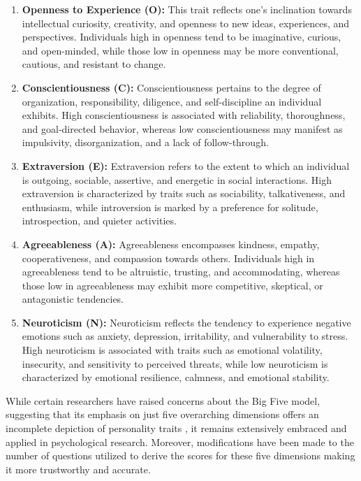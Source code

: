 \begin{enumerate}
    \item \textbf{Openness to Experience (O):} This trait reflects one's inclination towards intellectual curiosity, creativity, and openness to new ideas, experiences, and perspectives. Individuals high in openness tend to be imaginative, curious, and open-minded, while those low in openness may be more conventional, cautious, and resistant to change.
    \item \textbf{Conscientiousness (C):} Conscientiousness pertains to the degree of organization, responsibility, diligence, and self-discipline an individual exhibits. High conscientiousness is associated with reliability, thoroughness, and goal-directed behavior, whereas low conscientiousness may manifest as impulsivity, disorganization, and a lack of follow-through.
    \item \textbf{Extraversion (E):} Extraversion refers to the extent to which an individual is outgoing, sociable, assertive, and energetic in social interactions. High extraversion is characterized by traits such as sociability, talkativeness, and enthusiasm, while introversion is marked by a preference for solitude, introspection, and quieter activities.
    \item \textbf{Agreeableness (A):} Agreeableness encompasses kindness, empathy, cooperativeness, and compassion towards others. Individuals high in agreeableness tend to be altruistic, trusting, and accommodating, whereas those low in agreeableness may exhibit more competitive, skeptical, or antagonistic tendencies.
    \item \textbf{Neuroticism (N):} Neuroticism reflects the tendency to experience negative emotions such as anxiety, depression, irritability, and vulnerability to stress. High neuroticism is associated with traits such as emotional volatility, insecurity, and sensitivity to perceived threats, while low neuroticism is characterized by emotional resilience, calmness, and emotional stability.
\end{enumerate}

While certain researchers have raised concerns about the Big Five model, suggesting that its emphasis on just five overarching dimensions offers an incomplete depiction of personality traits \cite{Block1995ACV}, it remains extensively embraced and applied in psychological research. Moreover, modifications have been made to the number of questions utilized to derive the scores for these five dimensions  \cite{JOHNSON201478} making it more trustworthy and accurate. 

